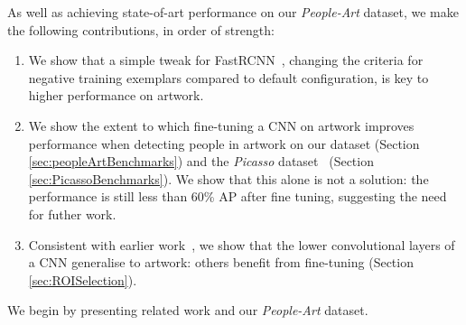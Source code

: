 \documentclass[runningheads]{llncs}
\begin{document}
As well as achieving state-of-art performance on our \textit{People-Art} dataset,
we make the following contributions, in order of strength:
\begin{enumerate}
\item We show that a simple tweak for \ac{FastRCNN}~\cite{girshick2015fast}, changing the criteria for negative training exemplars compared to default configuration, is key to higher performance on artwork.
\item We show the extent to which fine-tuning a \ac{CNN} on \ac{artwork} improves performance when detecting people in \ac{artwork} on our dataset (Section \ref{sec:peopleArtBenchmarks}) and the \textit{Picasso} dataset~\cite{ginosar2014detecting} (Section \ref{sec:PicassoBenchmarks}).
  We show that this alone is not a solution: the performance is still less than 60\% AP after fine tuning, suggesting the need for futher work.
\item Consistent with earlier work~\cite{yosinski2014transferable}, we show that the lower convolutional layers of a \ac{CNN} generalise to artwork: others benefit from fine-tuning (Section \ref{sec:ROISelection}).
\end{enumerate}
We begin by presenting related work and our \textit{People-Art} dataset.
 
\end{document}
